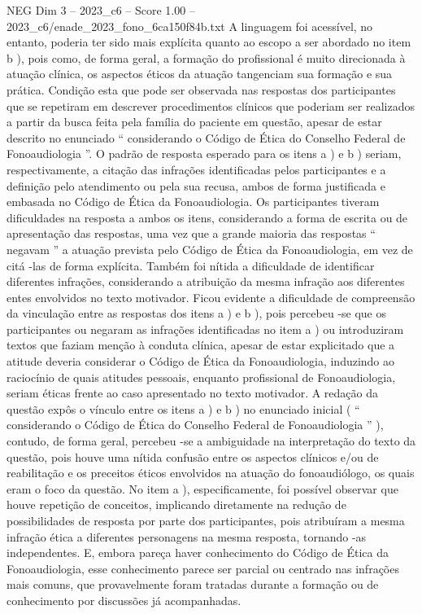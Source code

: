 \begin{textsample}{NEG Dim 3 – 2023\_c6 – Score 1.00 – 2023\_c6/enade\_2023\_fono\_6ca150f84b.txt}
A linguagem foi acessível, no entanto, poderia ter sido mais explícita quanto ao escopo a ser abordado no item b ), pois como, de forma geral, a formação do profissional é muito direcionada à atuação clínica, os aspectos éticos da atuação tangenciam sua formação e sua prática.
Condição esta que pode ser observada nas respostas dos participantes que se repetiram em descrever procedimentos clínicos que poderiam ser realizados a partir da busca feita pela família do paciente em questão, apesar de estar descrito no enunciado “ considerando o Código de Ética do Conselho Federal de Fonoaudiologia ”.
O padrão de resposta esperado para os itens a ) e b ) seriam, respectivamente, a citação das infrações identificadas pelos participantes e a definição pelo atendimento ou pela sua recusa, ambos de forma justificada e embasada no Código de Ética da Fonoaudiologia.
Os participantes tiveram dificuldades na resposta a ambos os itens, considerando a forma de escrita ou de apresentação das respostas, uma vez que a grande maioria das respostas “ negavam ” a atuação prevista pelo Código de Ética da Fonoaudiologia, em vez de citá -las de forma explícita.
Também foi nítida a dificuldade de identificar diferentes infrações, considerando a atribuição da mesma infração aos diferentes entes envolvidos no texto motivador.
Ficou evidente a dificuldade de compreensão da vinculação entre as respostas dos itens a ) e b ), pois percebeu -se que os participantes ou negaram as infrações identificadas no item a ) ou introduziram textos que faziam menção à conduta clínica, apesar de estar explicitado que a atitude deveria considerar o Código de Ética da Fonoaudiologia, induzindo ao raciocínio de quais atitudes pessoais, enquanto profissional de Fonoaudiologia, seriam éticas frente ao caso apresentado no texto motivador.
A redação da questão expôs o vínculo entre os itens a ) e b ) no enunciado inicial ( “ considerando o Código de Ética do Conselho Federal de Fonoaudiologia ” ), contudo, de forma geral, percebeu -se a ambiguidade na interpretação do texto da questão, pois houve uma nítida confusão entre os aspectos clínicos e/ou de reabilitação e os preceitos éticos envolvidos na atuação do fonoaudiólogo, os quais eram o foco da questão.
No item a ), especificamente, foi possível observar que houve repetição de conceitos, implicando diretamente na redução de possibilidades de resposta por parte dos participantes, pois atribuíram a mesma infração ética a diferentes personagens na mesma resposta, tornando -as independentes.
E, embora pareça haver conhecimento do Código de Ética da Fonoaudiologia, esse conhecimento parece ser parcial ou centrado nas infrações mais comuns, que provavelmente foram tratadas durante a formação ou de conhecimento por discussões já acompanhadas.

\end{textsample}
